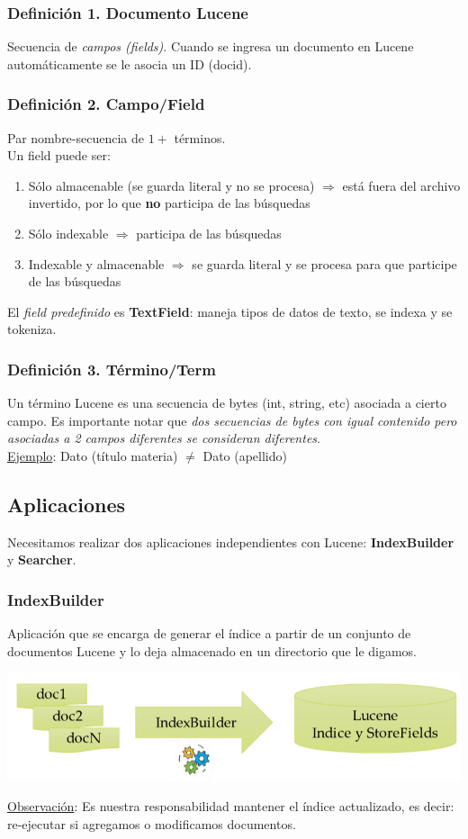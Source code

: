 \documentclass{article}
\begin{document}
\subsubsection*{Definición 1. Documento Lucene}
Secuencia de \emph{campos (fields)}. Cuando se ingresa un documento en Lucene automáticamente se le asocia un ID (docid).

\subsubsection*{Definición 2. Campo/Field}
Par nombre-secuencia de $1+$ términos.
\\Un field puede ser:
\begin{enumerate}
    \item Sólo almacenable (se guarda literal y no se procesa) $\Rightarrow$ está fuera del archivo invertido, por lo que \textbf{no} participa de las búsquedas
    \item Sólo indexable $\Rightarrow$ participa de las búsquedas
    \item Indexable y almacenable $\Rightarrow$ se guarda literal y se procesa para que participe de las búsquedas
\end{enumerate}
El \emph{field predefinido} es \textbf{TextField}: maneja tipos de datos de texto, se indexa y se tokeniza.

\subsubsection*{Definición 3. Término/Term}
Un término Lucene es una secuencia de bytes (int, string, etc) asociada a cierto campo.
Es importante notar que \emph{dos secuencias de bytes con igual contenido pero asociadas a 2 campos diferentes se consideran diferentes}.
\\\underline{Ejemplo}: Dato (título materia) $\neq$ Dato (apellido)

\subsection{Aplicaciones}
Necesitamos realizar dos aplicaciones independientes con Lucene: \textbf{IndexBuilder} y \textbf{Searcher}.
\subsubsection{IndexBuilder}
Aplicación que se encarga de generar el índice a partir de un conjunto de documentos Lucene y lo deja almacenado en un directorio que le digamos.
\begin{center}
    \includegraphics[width=.70\textwidth]{Images/IndexBuilder.png}
\end{center}
\underline{Observación}: Es nuestra responsabilidad mantener el índice actualizado, es decir: re-ejecutar si agregamos o modificamos documentos.
\end{document}
